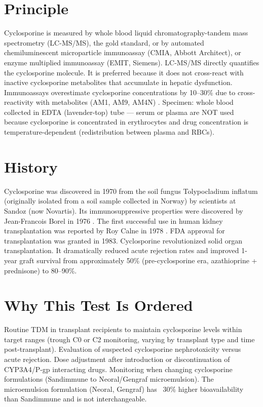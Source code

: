 \section*{Principle}
Cyclosporine is measured by whole blood liquid chromatography-tandem mass spectrometry (LC-MS/MS), the gold standard, or by automated chemiluminescent microparticle immunoassay (CMIA, Abbott Architect), or enzyme multiplied immunoassay (EMIT, Siemens). LC-MS/MS directly quantifies the cyclosporine molecule. It is preferred because it does not cross-react with inactive cyclosporine metabolites that accumulate in hepatic dysfunction. Immunoassays overestimate cyclosporine concentrations by 10--30\% due to cross-reactivity with metabolites (AM1, AM9, AM4N) \cite{holt2002international}. Specimen: whole blood collected in EDTA (lavender-top) tube --- serum or plasma are NOT used because cyclosporine is concentrated in erythrocytes and drug concentration is temperature-dependent (redistribution between plasma and RBCs).

\section*{History}
Cyclosporine was discovered in 1970 from the soil fungus Tolypocladium inflatum (originally isolated from a soil sample collected in Norway) by scientists at Sandoz (now Novartis). Its immunosuppressive properties were discovered by Jean-Francois Borel in 1976 \cite{borel1976biological}. The first successful use in human kidney transplantation was reported by Roy Calne in 1978 \cite{calne1978cyclosporin}. FDA approval for transplantation was granted in 1983. Cyclosporine revolutionized solid organ transplantation. It dramatically reduced acute rejection rates and improved 1-year graft survival from approximately 50\% (pre-cyclosporine era, azathioprine + prednisone) to 80--90\%.

\section*{Why This Test Is Ordered}
Routine TDM in transplant recipients to maintain cyclosporine levels within target ranges (trough C0 or C2 monitoring, varying by transplant type and time post-transplant). Evaluation of suspected cyclosporine nephrotoxicity versus acute rejection. Dose adjustment after introduction or discontinuation of CYP3A4/P-gp interacting drugs. Monitoring when changing cyclosporine formulations (Sandimmune to Neoral/Gengraf microemulsion). The microemulsion formulation (Neoral, Gengraf) has ~30\% higher bioavailability than Sandimmune and is not interchangeable.

